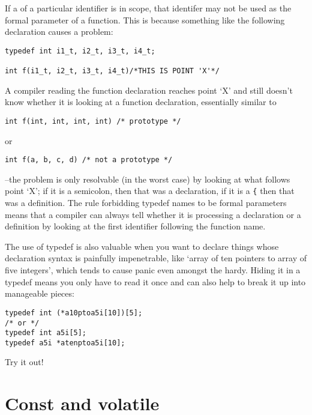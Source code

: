   If a \typedef{} of a particular identifier is in scope, that
   identifer may not be used as the formal parameter of a function. This is
   because something like the following declaration causes a problem:


\begin{Verbatim}
typedef int i1_t, i2_t, i3_t, i4_t;

int f(i1_t, i2_t, i3_t, i4_t)/*THIS IS POINT 'X'*/
\end{Verbatim}

  A compiler reading the function declaration reaches point `X' and
   still doesn't know whether it is looking at a function declaration,
   essentially similar to


\begin{Verbatim}
int f(int, int, int, int) /* prototype */
\end{Verbatim}

  or


\begin{Verbatim}
int f(a, b, c, d) /* not a prototype */
\end{Verbatim}

  --the problem is only resolvable (in the worst case) by looking at
   what follows point `X'; if it is a semicolon, then that was
   a declaration, if it is a \texttt{\{} then that was a definition. The
   rule forbidding typedef names to be formal parameters means that
   a compiler can always tell whether it is processing a declaration or
   a definition by looking at the first identifier following the function
   name.


  The use of typedef is also valuable when you want to declare things
   whose declaration syntax is painfully impenetrable, like `array of ten
   pointers to array of five integers', which tends to cause panic even
   amongst the hardy. Hiding it in a typedef means you only have to read it
   once and can also help to break it up into manageable pieces:


\begin{Verbatim}
typedef int (*a10ptoa5i[10])[5];
/* or */
typedef int a5i[5];
typedef a5i *atenptoa5i[10];
\end{Verbatim}

  Try it out!


 
        \section{Const and volatile}
        

